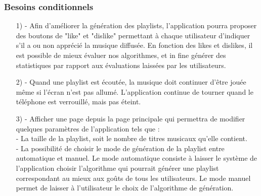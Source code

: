 \documentclass[12pt, openany]{report}
\begin{document}
\subsubsection{Besoins conditionnels}
\begin{itemize}
\item[1) -]Afin d'améliorer la génération des playlists, l'application pourra proposer des boutons de "like" et "dislike" permettant à chaque utilisateur d'indiquer s'il a ou non apprécié la musique diffusée. En fonction des likes et dislikes, il est possible de mieux évaluer nos algorithmes, et in fine générer des statistiques par rapport aux évaluations laissées par les utilisateurs.

\item[2) -]Quand une playlist est écoutée, la musique doit continuer d'être jouée même si l'écran n'est pas allumé. L'application continue de tourner quand le téléphone est verrouillé, mais pas éteint. 

\item[3) -]Afficher une page depuis la page principale qui permettra de modifier quelques paramètres de l'application tels que : \\
- La taille de la playlist, soit le nombre de titres musicaux qu'elle contient. \\
- La possibilité de choisir le mode de génération de la playlist entre automatique et manuel. Le mode automatique consiste à laisser le système de l'application choisir l'algorithme qui pourrait générer une playlist correspondant au mieux aux goûts de tous les utilisateurs. Le mode manuel permet de laisser à l'utilisateur le choix de l'algorithme de génération.

\end{itemize}
\end{document}
